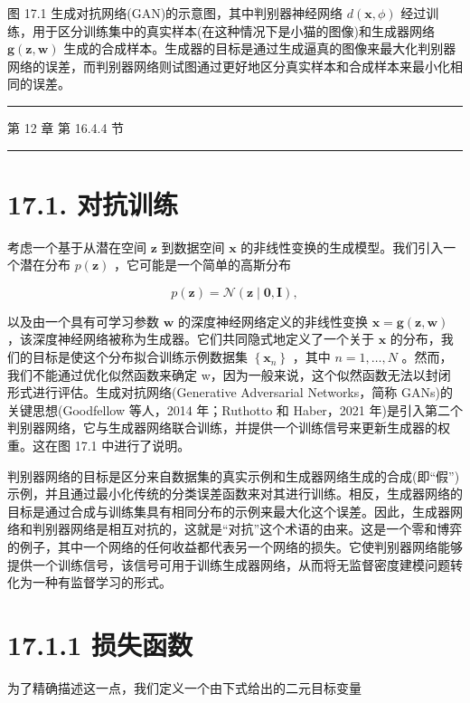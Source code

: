 \documentclass[10pt]{article}
\newcommand{\HRule}{\begin{center}\rule{0.9\linewidth}{0.2mm}\end{center}}
\begin{document}
图 17.1 生成对抗网络(GAN)的示意图，其中判别器神经网络 \(d\left( {\mathbf{x},\phi }\right)\) 经过训练，用于区分训练集中的真实样本(在这种情况下是小猫的图像)和生成器网络 \(\mathbf{g}\left( {\mathbf{z},\mathbf{w}}\right)\) 生成的合成样本。生成器的目标是通过生成逼真的图像来最大化判别器网络的误差，而判别器网络则试图通过更好地区分真实样本和合成样本来最小化相同的误差。

\HRule

第 12 章 第 16.4.4 节

\HRule

\section*{17.1. 对抗训练}

考虑一个基于从潜在空间 \(\mathbf{z}\) 到数据空间 \(\mathbf{x}\) 的非线性变换的生成模型。我们引入一个潜在分布 \(p\left( \mathbf{z}\right)\) ，它可能是一个简单的高斯分布

\[
p\left( \mathbf{z}\right)  = \mathcal{N}\left( {\mathbf{z} \mid  \mathbf{0},\mathbf{I}}\right) , \tag{17.1}
\]

以及由一个具有可学习参数 \(\mathbf{w}\) 的深度神经网络定义的非线性变换 \(\mathbf{x} = \mathbf{g}\left( {\mathbf{z},\mathbf{w}}\right)\) ，该深度神经网络被称为生成器。它们共同隐式地定义了一个关于 \(\mathbf{x}\) 的分布，我们的目标是使这个分布拟合训练示例数据集 \(\left\{  {\mathbf{x}}_{n}\right\}\) ，其中 \(n = 1,\ldots ,N\) 。然而，我们不能通过优化似然函数来确定 w，因为一般来说，这个似然函数无法以封闭形式进行评估。生成对抗网络(Generative Adversarial Networks，简称 GANs)的关键思想(Goodfellow 等人，2014 年；Ruthotto 和 Haber，2021 年)是引入第二个判别器网络，它与生成器网络联合训练，并提供一个训练信号来更新生成器的权重。这在图 17.1 中进行了说明。

判别器网络的目标是区分来自数据集的真实示例和生成器网络生成的合成(即“假”)示例，并且通过最小化传统的分类误差函数来对其进行训练。相反，生成器网络的目标是通过合成与训练集具有相同分布的示例来最大化这个误差。因此，生成器网络和判别器网络是相互对抗的，这就是“对抗”这个术语的由来。这是一个零和博弈的例子，其中一个网络的任何收益都代表另一个网络的损失。它使判别器网络能够提供一个训练信号，该信号可用于训练生成器网络，从而将无监督密度建模问题转化为一种有监督学习的形式。

\section*{17.1.1 损失函数}

为了精确描述这一点，我们定义一个由下式给出的二元目标变量
\end{document}
